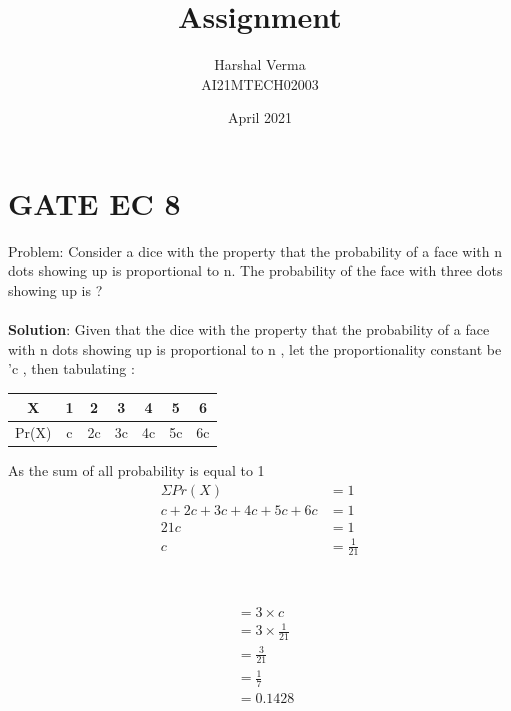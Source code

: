 \documentclass[journal,12pt,twocolumn]{IEEEtran}
\title{Assignment  }
\author{Harshal Verma\\
AI21MTECH02003}
\date{April 2021}
\begin{document}
\maketitle
\section{GATE EC 8}
Problem: Consider a dice with the property that the probability of a face with n dots showing up is proportional to n. The probability of the face with three dots showing up is ?\\
\\
\textbf{Solution}: Given that the dice with the
 property that the probability of a face with n dots showing up is proportional to n , let the proportionality constant be 'c , then tabulating :
\\
\begin{center}
\begin{tabular}{ |c | c | c | c | c | c | c |}
\hline
X     & 1 & 2 & 3 & 4 & 5 & 6 \\
\hline
Pr(X) & c & 2c&3c &4c & 5c & 6c\\
\hline
\end{tabular}
\end{center}
\smallskip
As the sum of all probability is equal to 1\\
\begin{align*}
\Sigma Pr(X) &= 1\\
c + 2c + 3c + 4c + 5c + 6c &= 1\\
21c &= 1\\
c &= \frac{1}{21}\\
\end{align*}
\smallskip
{} \\
\\
\begin{align*}
&= 3 \times c\\
&= 3\times\frac{1}{21}\\
&= \frac{3}{21}\\
&= \frac{1}{7}\\
&= 0.1428   
\end{align*}
\samllskip
\end{document}
